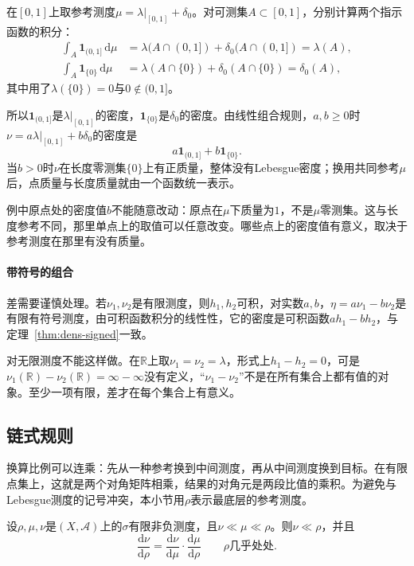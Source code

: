 \begin{example}[点质量与长度的统一表示]
\label{ex:dens-mixed-reference}
在$[0,1]$上取参考测度$\mu=\lambda|_{[0,1]}+\delta_0$。对可测集$A\subset[0,1]$，分别计算两个指示函数的积分：
\[
\begin{aligned}
\int_A\mathbf 1_{(0,1]}\,\mathrm d\mu&=\lambda(A\cap(0,1])+\delta_0(A\cap(0,1])=\lambda(A),\\
\int_A\mathbf 1_{\{0\}}\,\mathrm d\mu&=\lambda(A\cap\{0\})+\delta_0(A\cap\{0\})=\delta_0(A),
\end{aligned}
\]
其中用了$\lambda(\{0\})=0$与$0\notin(0,1]$。

所以$\mathbf 1_{(0,1]}$是$\lambda|_{[0,1]}$的密度，$\mathbf 1_{\{0\}}$是$\delta_0$的密度。由线性组合规则，$a,b\geq0$时$\nu=a\lambda|_{[0,1]}+b\delta_0$的密度是
\[
a\mathbf 1_{(0,1]}+b\mathbf 1_{\{0\}} .
\]
当$b>0$时$\nu$在长度零测集$\{0\}$上有正质量，整体没有Lebesgue密度；换用共同参考$\mu$后，点质量与长度质量就由一个函数统一表示。
\end{example}

例中原点处的密度值$b$不能随意改动：原点在$\mu$下质量为$1$，不是$\mu$零测集。这与长度参考不同，那里单点上的取值可以任意改变。哪些点上的密度值有意义，取决于参考测度在那里有没有质量。

\paragraph{带符号的组合}
差需要谨慎处理。若$\nu_1,\nu_2$是有限测度，则$h_1,h_2$可积，对实数$a,b$，$\eta=a\nu_1-b\nu_2$是有限有符号测度，由可积函数积分的线性性，它的密度是可积函数$ah_1-bh_2$，与定理~\ref{thm:dens-signed}一致。

对无限测度不能这样做。在$\mathbb R$上取$\nu_1=\nu_2=\lambda$，形式上$h_1-h_2=0$，可是$\nu_1(\mathbb R)-\nu_2(\mathbb R)=\infty-\infty$没有定义，“$\nu_1-\nu_2$”不是在所有集合上都有值的对象。至少一项有限，差才在每个集合上有意义。

\subsection{链式规则}
\label{sec:dens-chain-rule}

换算比例可以连乘：先从一种参考换到中间测度，再从中间测度换到目标。在有限点集上，这就是两个对角矩阵相乘，结果的对角元是两段比值的乘积。为避免与Lebesgue测度的记号冲突，本小节用$\rho$表示最底层的参考测度。

\begin{theorem}[密度的链式规则]
\label{thm:dens-chain-rule}
设$\rho,\mu,\nu$是$(X,\mathcal A)$上的$\sigma$有限非负测度，且$\nu\ll\mu\ll\rho$。则$\nu\ll\rho$，并且
\begin{equation}
\frac{\mathrm d\nu}{\mathrm d\rho}=\frac{\mathrm d\nu}{\mathrm d\mu}\cdot\frac{\mathrm d\mu}{\mathrm d\rho}\qquad\rho\text{几乎处处}.
\label{eq:dens-chain}
\end{equation}
\end{theorem}

